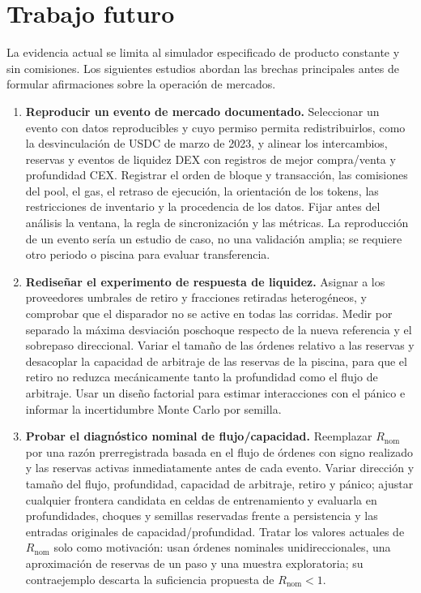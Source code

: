 \chapter{Trabajo futuro}
\label{cap:futuro}

La evidencia actual se limita al simulador especificado de producto constante y sin comisiones. Los siguientes estudios abordan las brechas principales antes de formular afirmaciones sobre la operación de mercados.

\begin{enumerate}
  \item \textbf{Reproducir un evento de mercado documentado.} Seleccionar un evento con datos reproducibles y cuyo permiso permita redistribuirlos, como la desvinculación de USDC de marzo de 2023, y alinear los intercambios, reservas y eventos de liquidez DEX con registros de mejor compra/venta y profundidad CEX. Registrar el orden de bloque y transacción, las comisiones del pool, el gas, el retraso de ejecución, la orientación de los tokens, las restricciones de inventario y la procedencia de los datos. Fijar antes del análisis la ventana, la regla de sincronización y las métricas. La reproducción de un evento sería un estudio de caso, no una validación amplia; se requiere otro periodo o piscina para evaluar transferencia.
  \item \textbf{Rediseñar el experimento de respuesta de liquidez.} Asignar a los proveedores umbrales de retiro y fracciones retiradas heterogéneos, y comprobar que el disparador no se active en todas las corridas. Medir por separado la máxima desviación poschoque respecto de la nueva referencia y el sobrepaso direccional. Variar el tamaño de las órdenes relativo a las reservas y desacoplar la capacidad de arbitraje de las reservas de la piscina, para que el retiro no reduzca mecánicamente tanto la profundidad como el flujo de arbitraje. Usar un diseño factorial para estimar interacciones con el pánico e informar la incertidumbre Monte Carlo por semilla.
  \item \textbf{Probar el diagnóstico nominal de flujo/capacidad.} Reemplazar $R_{\mathrm{nom}}$ por una razón prerregistrada basada en el flujo de órdenes con signo realizado y las reservas activas inmediatamente antes de cada evento. Variar dirección y tamaño del flujo, profundidad, capacidad de arbitraje, retiro y pánico; ajustar cualquier frontera candidata en celdas de entrenamiento y evaluarla en profundidades, choques y semillas reservadas frente a persistencia y las entradas originales de capacidad/profundidad. Tratar los valores actuales de $R_{\mathrm{nom}}$ solo como motivación: usan órdenes nominales unidireccionales, una aproximación de reservas de un paso y una muestra exploratoria; su contraejemplo descarta la suficiencia propuesta de $R_{\mathrm{nom}}<1$.

\end{enumerate}

